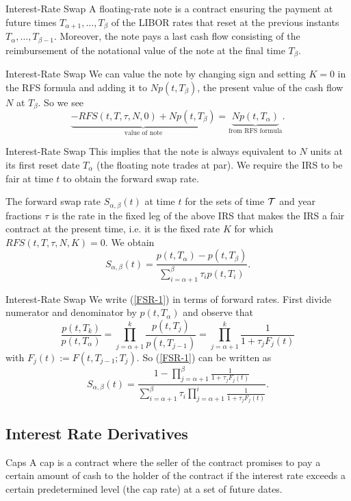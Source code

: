 Interest-Rate Swap
	A floating-rate note is a contract ensuring the payment at future times
	$T_{\alpha+1},\ldots,T_{\beta}$ of the LIBOR rates that reset at the previous instants
	$T_{\alpha},\ldots,T_{\beta-1}$. Moreover, the note pays a last
	cash flow consisting of the reimbursement of the notational value
	of the note at the final time $T_{\beta}$.


Interest-Rate Swap
	We can value the note by changing sign and setting $K=0$ in the
	RFS formula and adding it to $Np(t,T_{\beta})$, the present value
	of the cash flow $N$ at $T_{\beta}$. So we see
		$$
		\underbrace{-RFS(t,T,\tau,N,0)+Np(t,T_{\beta})}_{\mbox{value of note}}=
		\underbrace{Np(t,T_{\alpha})}_{\mbox{from RFS formula}}.
		$$


Interest-Rate Swap
	This implies that the note is always equivalent to $N$ units at
	its first reset date $T_{\alpha}$ (the floating note trades at
	par). We require the IRS to be fair at time $t$ to obtain the
	forward swap rate.

	The forward swap rate $S_{\alpha,\beta}(t)$ at time $t$ for the
	sets of time $\cal T$ and year fractions $\tau$ is the rate in the
	fixed leg of the above IRS that makes the IRS a fair contract at
	the present time, i.e. it is the fixed rate $K$ for which
	$RFS(t,T,\tau,N,K)=0$. We obtain
		\begin{equation}\label{FSR-1}
		S_{\alpha,\beta}(t)=\frac{p(t,T_{\alpha})-p(t,T_{\beta})}{\sum_{i=\alpha+1}^{\beta}\tau_ip(t,T_i)}.
		\end{equation}
	
	
Interest-Rate Swap
	We write (\ref{FSR-1}) in terms of forward rates. First divide numerator
	and denominator by $p(t,T_{\alpha})$ and observe that
		$$
		\frac{p(t,T_k)}{p(t,T_{\alpha})}=
		\prod_{j=\alpha+1}^k\frac{p(t,T_j)}{p(t,T_{j-1})}=
		\prod_{j=\alpha+1}^k\frac{1}{1+\tau_jF_j(t)}
		$$
	with $F_j(t):=F(t,T_{j-1};T_j)$. So (\ref{FSR-1}) can be written as
		\begin{equation}
		S_{\alpha,\beta}(t)=
		\frac{1-\prod_{j=\alpha+1}^{\beta}\frac{1}{1+\tau_jF_j(t)}}
		{\sum_{i=\alpha+1}^{\beta}\tau_i\prod_{j=\alpha+1}^{i}\frac{1}{1+\tau_jF_j(t)}}.
		\end{equation}


\subsection{Interest Rate Derivatives}
Caps
	A cap is a contract where the seller of the contract promises to
	pay a certain amount of cash to the holder of the contract if the
	interest rate exceeds a certain predetermined level (the cap rate)
	at a set of future dates.


